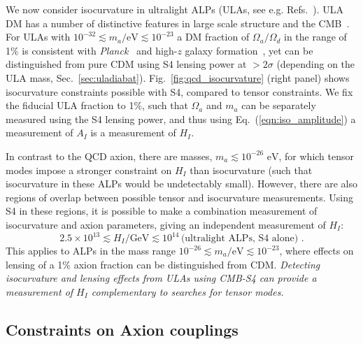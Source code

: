 We now consider isocurvature in ultralight ALPs (ULAs, see e.g. Refs.~\cite{Marsh:2013taa,Marsh:2014qoa}). ULA DM has a number of distinctive features in large scale structure and the CMB~\cite{Hlozek:2015axa,Marsh:2013ywa}. For ULAs with $10^{-32}\lesssim m_a/\text{eV}\lesssim 10^{-23}$ a DM fraction of $\Omega_a/\Omega_d$ in the range of 1\% is consistent with \emph{Planck}~\cite{Hlozek:2015axa} and high-$z$ galaxy formation~\cite{Bozek:2014uqa,Schive:2015kza}, yet can be distinguished from pure CDM using S4 lensing power at $>2\sigma$ (depending on the ULA mass, Sec.~\ref{sec:uladiabat}). Fig.~\ref{fig:qcd_isocurvature} (right panel) shows isocurvature constraints possible with S4, compared to tensor constraints. We fix the fiducial ULA fraction to 1\%, such that $\Omega_a$ and $m_a$ can be separately measured using the S4 lensing power, and thus using Eq.~(\ref{eqn:iso_amplitude}) a measurement of $A_I$ is a measurement of $H_I$. 

In contrast to the QCD axion, there are masses, $m_a\lesssim 10^{-26}\text{ eV}$, for which tensor modes impose a stronger constraint on $H_I$ than isocurvature (such that isocurvature in these ALPs would be undetectably small). However, there are also regions of overlap between possible tensor and isocurvature measurements. Using S4 in these regions, it is possible to make a combination measurement of isocurvature and axion parameters, giving an independent measurement of $H_I$:
\begin{equation} 2.5\times 10^{13}\lesssim H_I/\text{GeV}\lesssim 10^{14}\,
\text{(ultralight ALPs, S4 alone)}\,\,.
\end{equation}
This applies to ALPs in the mass range $10^{-26}\lesssim m_a/\text{eV}\lesssim 10^{-23}$, where effects on lensing of a 1\% axion fraction can be distinguished from CDM. \emph{Detecting isocurvature and lensing effects from ULAs using CMB-S4 can provide a measurement of $H_I$ complementary to searches for tensor modes.}%


\subsection{Constraints on Axion couplings}


